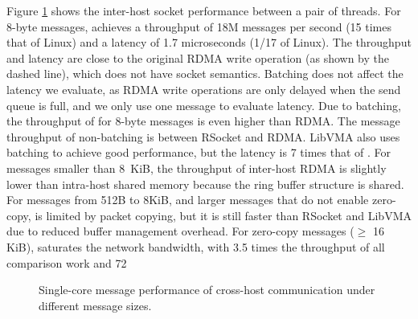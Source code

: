 Figure \ref {socksdirect:fig:eval-msgsize-inter} shows the inter-host socket performance between a pair of threads. For 8-byte messages, \sys{} achieves a throughput of 18M messages per second (15 times that of Linux) and a latency of 1.7 microseconds (1/17 of Linux). The throughput and latency are close to the original RDMA write operation (as shown by the dashed line), which does not have socket semantics. Batching does not affect the latency we evaluate, as RDMA write operations are only delayed when the send queue is full, and we only use one message to evaluate latency. Due to batching, the throughput of \sys  {} for 8-byte messages is even higher than RDMA. The message throughput of non-batching \sys{} is between RSocket and RDMA. LibVMA also uses batching to achieve good performance, but the latency is 7 times that of \sys  {}. For messages smaller than 8~KiB, the throughput of inter-host RDMA is slightly lower than intra-host shared memory because the ring buffer structure is shared. For messages from 512B to 8KiB, and larger messages that do not enable zero-copy, \sys  {} is limited by packet copying, but it is still faster than RSocket and LibVMA due to reduced buffer management overhead. For zero-copy messages ($\ge$ 16 KiB), \sys  {} saturates the network bandwidth, with 3.5 times the throughput of all comparison work and 72%

\begin{figure}[htbp]
	\centering
	
	\caption{Single-core message performance of cross-host communication under different message sizes.}
	\label{socksdirect:fig:eval-msgsize-inter}
\end{figure}

